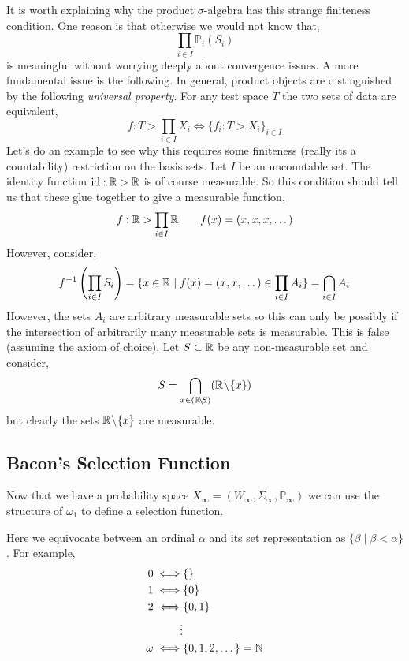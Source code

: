 \documentclass[12pt]{article}
\renewcommand{\P}{\mathbb{P}}
\begin{document}
\begin{rmk}
It is worth explaining why the product $\sigma$-algebra has this strange finiteness condition. One reason is that otherwise we would not know that,
\[ \prod_{i \in I} \P_i(S_i) \]
is meaningful without worrying deeply about convergence issues. A more fundamental issue is the following. In general, product objects are distinguished by the following \textit{universal property}. For any test space $T$ the two sets of data are equivalent,
\[ f : T > \prod_{i \in I} X_i \iff \{ f_i : T > X_i \}_{i \in I} \]
Let's do an example to see why this requires some finiteness (really its a countability) restriction on the basis sets. Let $I$ be an uncountable set. The identity function $\mathrm{id} : \mathbb{R} > \mathbb{R}$ is of course measurable. So this condition should tell us that these glue together to give a measurable function,
\[ f : \mathbb{R} > \prod_{i \in I} \mathbb{R} \quad \quad f(x) = (x,x,x,\dots) \]
However, consider,
\[ f^{-1} \left( \prod_{i \in I} S_i \right) = \{ x \in \mathbb{R} \mid f(x) = (x,x, \dots) \in \prod_{i \in I} A_i \} = \bigcap_{i \in I} A_i \]
However, the sets $A_i$ are arbitrary measurable sets so this can only be possibly if the intersection of arbitrarily many measurable sets is measurable. This is false (assuming the axiom of choice). Let $S \subset \mathbb{R}$ be any non-measurable set and consider,
\[ S = \bigcap_{x \in (\mathbb{R} \! \setminus \! S)} (\mathbb{R} \! \setminus \! \{ x \}) \]
but clearly the sets $\mathbb{R} \! \setminus \! \{ x \}$ are measurable. 
\end{rmk}

\subsection{Bacon's Selection Function}

Now that we have a probability space $X_{\infty} = (W_{\infty}, \Sigma_{\infty}, \P_{\infty})$ we can use the structure of $\omega_1$ to define a selection function.

\begin{rmk}
Here we equivocate between an ordinal $\alpha$ and its set representation as $\{ \beta \mid \beta < \alpha \}$. For example,
\begin{align*}
0 \iff & \{ \}
\\
1 \iff & \{ 0 \}
\\
2 \iff & \{ 0, 1 \}
\\
\vdots &
\\
\omega \iff & \{0, 1, 2, \dots \} = \mathbb{N} 
\end{align*}
\end{rmk}
\end{document}

